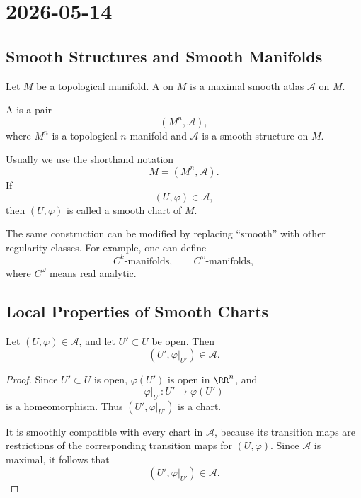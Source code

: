 \section{2026-05-14}

\subsection{Smooth Structures and Smooth Manifolds}

\begin{definition}
Let $M$ be a topological manifold. A  on $M$ is a maximal smooth atlas $\mathcal A$ on $M$.
\end{definition}

\begin{definition}
A  is a pair
\[
  (M^n,\mathcal A),
\]
where $M^n$ is a topological $n$-manifold and $\mathcal A$ is a smooth structure on $M$.
\end{definition}

Usually we use the shorthand notation
\[
  M=(M^n,\mathcal A).
\]
If
\[
  (U,\varphi)\in \mathcal A,
\]
then $(U,\varphi)$ is called a smooth chart of $M$.

\begin{remark}
The same construction can be modified by replacing ``smooth'' with other regularity classes. For example, one can define
\[
  C^k\text{-manifolds},\qquad C^\omega\text{-manifolds},
\]
where $C^\omega$ means real analytic.
\end{remark}

\subsection{Local Properties of Smooth Charts}

\begin{exercise}
Let $(U,\varphi)\in\mathcal A$, and let $U'\subset U$ be open. Then
\[
  (U',\varphi|_{U'})\in \mathcal A.
\]
\end{exercise}

\begin{proof}
Since $U'\subset U$ is open, $\varphi(U')$ is open in $\RR^n$, and
\[
  \varphi|_{U'}:U'\to \varphi(U')
\]
is a homeomorphism. Thus $(U',\varphi|_{U'})$ is a chart.

It is smoothly compatible with every chart in $\mathcal A$, because its transition maps are restrictions of the corresponding transition maps for $(U,\varphi)$. Since $\mathcal A$ is maximal, it follows that
\[
  (U',\varphi|_{U'})\in \mathcal A.
\]
\end{proof}

